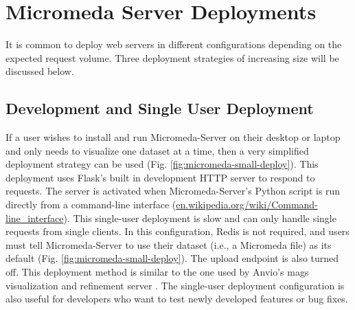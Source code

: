 \section{Micromeda Server Deployments} \label{micromeda-server-deployments}

It is common to deploy web servers in different configurations depending on the expected request volume. Three deployment strategies of increasing size will be discussed below. 

\subsection{Development and Single User Deployment}

If a user wishes to install and run Micromeda-Server on their desktop or laptop and only needs to visualize one dataset at a time, then a very simplified deployment strategy can be used (Fig. \ref{fig:micromeda-small-deploy}). This deployment uses Flask's built in development HTTP server to respond to requests. The server is activated when Micromeda-Server's Python script is run directly from a command-line interface (\href{en.wikipedia.org/wiki/Command-line\_interface}{en.wikipedia.org/wiki/Command-line\_interface}). This single-user deployment is slow and can only handle single requests from single clients. In this configuration, Redis is not required, and users must tell Micromeda-Server to use their dataset (i.e., a Micromeda file) as its default (Fig. \ref{fig:micromeda-small-deploy}). The upload endpoint is also turned off. This deployment method is similar to the one used by Anvio's \gls{mags} visualization and refinement server \cite{eren2015anvi}. The single-user deployment configuration is also useful for developers who want to test newly developed features or bug fixes.

